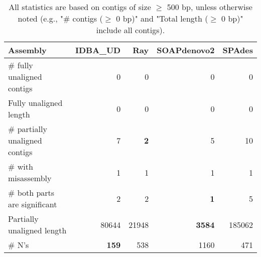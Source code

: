 \documentclass[12pt,a4paper]{article}
\begin{document}
\begin{table}[ht]
\begin{center}
\caption{All statistics are based on contigs of size $\geq$ 500 bp, unless otherwise noted (e.g., "\# contigs ($\geq$ 0 bp)" and "Total length ($\geq$ 0 bp)" include all contigs).}
\begin{tabular}{|l*{4}{|r}|}
\hline
Assembly & IDBA\_UD & Ray & SOAPdenovo2 & SPAdes \\ \hline
\# fully unaligned contigs & 0 & 0 & 0 & 0 \\ \hline
Fully unaligned length & 0 & 0 & 0 & 0 \\ \hline
\# partially unaligned contigs & 7 & {\bf 2} & 5 & 10 \\ \hline
\hspace{5mm}\# with misassembly & 1 & 1 & 1 & 1 \\ \hline
\hspace{5mm}\# both parts are significant & 2 & 2 & {\bf 1} & 5 \\ \hline
Partially unaligned length & 80644 & 21948 & {\bf 3584} & 185062 \\ \hline
\# N's & {\bf 159} & 538 & 1160 & 471 \\ \hline
\end{tabular}
\end{center}
\end{table}
\end{document}
